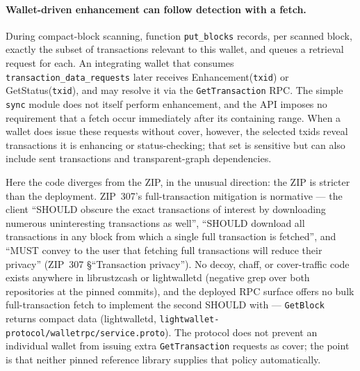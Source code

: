 \documentclass[11pt,a4paper]{article}
\theoremstyle{definition}
\begin{document}
\paragraph{Wallet-driven enhancement can follow detection with a fetch.}
During compact-block
scanning, function \texttt{put\_blocks} records, per scanned block, exactly
the subset of transactions relevant to this wallet, and queues a retrieval
request for each. An integrating wallet that consumes
\texttt{transaction\_data\_requests} later receives
\textsf{Enhancement}(\texttt{txid}) or \textsf{GetStatus}(\texttt{txid}),
and may resolve it via the \texttt{GetTransaction} RPC.
The simple \texttt{sync} module does not itself
perform enhancement, and the API imposes no requirement that a fetch occur
immediately after its containing range. When a wallet does issue these
requests without cover, however, the selected txids reveal transactions it
is enhancing or status-checking; that set is sensitive but can also include
sent transactions and transparent-graph dependencies.

Here the code diverges from the ZIP, in the unusual direction: the ZIP is
stricter than the deployment. ZIP~307's full-transaction mitigation is
normative --- the client ``SHOULD obscure the exact transactions of
interest by downloading numerous uninteresting transactions as well'',
``SHOULD download all transactions in any block from which a single full
transaction is fetched'', and ``MUST convey to the user that fetching full
transactions will reduce their privacy''
(ZIP~307 \S``Transaction privacy''). No decoy, chaff, or cover-traffic code
exists anywhere in \textsf{librustzcash} or \textsf{lightwalletd} (negative
grep over both repositories at the pinned commits), and the deployed RPC
surface offers no bulk full-transaction fetch to implement the second
SHOULD with --- \texttt{GetBlock} returns compact data
(\textsf{lightwalletd}, \texttt{lightwallet-protocol/walletrpc/service.proto}).
The protocol does not prevent an individual wallet from issuing extra
\texttt{GetTransaction} requests as cover; the point is that neither pinned
reference library supplies that policy automatically.
\end{document}
